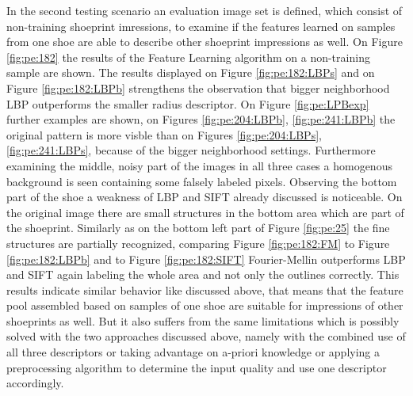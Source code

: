 \documentclass[draft,final]{vutinfth} %
\begin{document}
\par
In the second testing scenario an evaluation image set is defined, which consist of non-training shoeprint imressions, to examine if the features learned on samples from one shoe are able to describe other shoeprint impressions as well.
On Figure \ref{fig:pe:182} the results of the Feature Learning algorithm on a non-training sample are shown.
The results displayed on Figure \ref{fig:pe:182:LBPs} and on Figure \ref{fig:pe:182:LBPb} strengthens the observation that bigger neighborhood LBP outperforms the smaller radius descriptor.
On Figure \ref{fig:pe:LPBexp} further examples are shown, on Figures \ref{fig:pe:204:LBPb}, \ref{fig:pe:241:LBPb} the original pattern is more visble than on Figures \ref{fig:pe:204:LBPs}, \ref{fig:pe:241:LBPs}, because of the bigger neighborhood settings.
Furthermore examining the middle, noisy part of the images in all three cases a homogenous background is seen containing some falsely labeled pixels.
Observing the bottom part of the shoe a weakness of LBP and SIFT already discussed is noticeable.
On the original image there are small structures in the bottom area which are part of the shoeprint.
Similarly as on the bottom left part of Figure \ref{fig:pe:25} the fine structures are partially recognized, comparing Figure \ref{fig:pe:182:FM} to Figure \ref{fig:pe:182:LBPb} and to Figure \ref{fig:pe:182:SIFT} Fourier-Mellin outperforms LBP and SIFT again labeling the whole area and not only the outlines correctly.
This results indicate similar behavior like discussed above, that means that the feature pool assembled based on samples of one shoe are suitable for impressions of other shoeprints as well.
But it also suffers from the same limitations which is possibly solved with the two approaches discussed above, namely with the combined use of all three descriptors or taking advantage on a-priori knowledge or applying a preprocessing algorithm to determine the input quality and use one descriptor accordingly.
\end{document}
